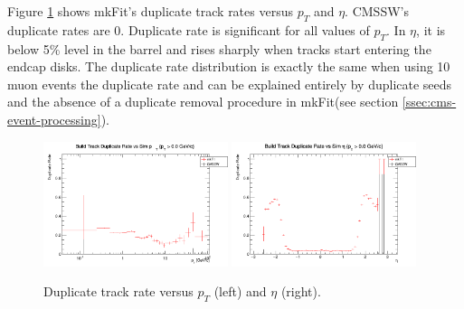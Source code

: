 \documentclass{webofc}
\def\mkfit{mkFit\xspace}
\def\GeVoc{\ensuremath{\,\rm{G}e\rm{V}/c}}
\def\twop{0.48\textwidth}
\def\postfigskip{\vskip-4mm}
\begin{document}


Figure \ref{fig:drates} shows \mkfit's duplicate track rates versus $p_T$ and
$\eta$. CMSSW's duplicate rates are 0. Duplicate rate is significant for all
values of $p_T$. In $\eta$, it is below 5\% level in the barrel and rises
sharply when tracks start entering the endcap disks. The duplicate rate 
distribution is exactly the same when using 10 muon events the duplicate rate 
and can be explained entirely by duplicate seeds and the absence of a duplicate
 removal procedure in \mkfit (see section \ref{ssec:cms-event-processing}).

\begin{figure}[thb]
  \centering
  \includegraphics[width=\twop]{figs/phys/SKL-SP_CMSSW_TTbar_PU70_dr_pt_logx_build_pt0p0_SIMVAL.png}
  \hfill
  \includegraphics[width=\twop]{figs/phys/SKL-SP_CMSSW_TTbar_PU70_dr_eta_build_pt0p0_SIMVAL.png}
  \postfigskip

  \caption{Duplicate track rate versus $p_T$ (left) and $\eta$ (right).}
  \label{fig:drates}
\end{figure}
\end{document}
